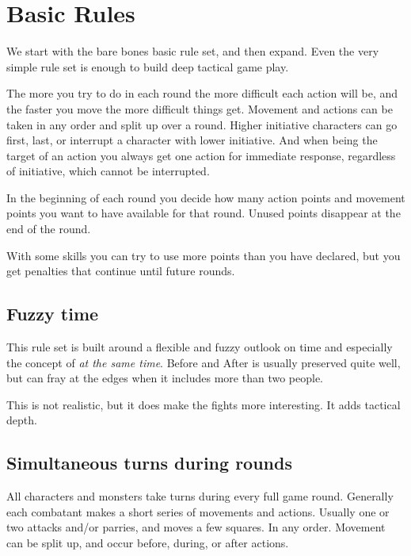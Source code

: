 
\section*{Basic Rules}
We start with the bare bones basic rule set, and then expand. Even the very simple rule set is enough to build deep tactical game play.

The more you try to do in each round the more difficult each action will be, and the faster you move the more difficult things get. Movement and actions can be taken in any order and split up over a round. Higher initiative characters can go first, last, or interrupt a character with lower initiative. And when being the target of an action you always get one action for immediate response, regardless of initiative, which cannot be interrupted.

In the beginning of each round you decide how many action points and movement points you want to have available for that round. Unused points disappear at the end of the round.

With some skills you can try to use more points than you have declared, but you get penalties that continue until future rounds.


\subsection*{Fuzzy time}
This rule set is built around a flexible and fuzzy outlook on time and especially the concept of \emph{at the same time}. Before and After is usually preserved quite well, but can fray at the edges when it includes more than two people.

This is not realistic, but it does make the fights more interesting. It adds tactical depth.


\subsection*{Simultaneous turns during rounds}
All characters and monsters take turns during every full game round. Generally each combatant makes a short series of movements and actions. Usually one or two attacks and/or parries, and moves a few squares. In any order. Movement can be split up, and occur before, during, or after actions.

